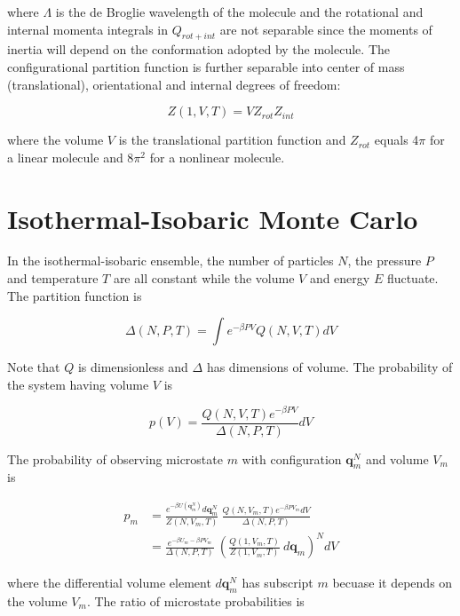 where $\Lambda$ is the de Broglie wavelength of the molecule and the rotational and internal momenta integrals in $Q_{rot+int}$ are not separable since the moments of inertia will depend on the conformation adopted by the molecule. The configurational partition function is further separable into center of mass (translational), orientational and internal degrees of freedom:

\begin{equation}
\label{eq:configPartitionFn_1VT}
Z(1,V,T) = VZ_{rot}Z_{int}
\end{equation}

where the volume $V$ is the translational partition function and $Z_{rot}$ equals 4$\pi$ for a linear molecule and 8$\pi^2$ for a nonlinear molecule.

\section{Isothermal-Isobaric Monte Carlo}
\label{sec:NPT}
In the isothermal-isobaric ensemble, the number of particles $N$, the pressure $P$ and temperature $T$ are all constant while the volume $V$ and energy $E$ fluctuate. The partition function is

\begin{equation}
\label{eq:partitionFn_NPT}
\Delta(N,P,T) = \int e^{-\beta P V} Q(N,V,T) dV
\end{equation}

Note that $Q$ is dimensionless and $\Delta$ has dimensions of volume. The probability of the system having volume $V$ is 

\begin{equation}
\label{eq:pV}
p(V) = \frac{Q(N,V,T)e^{-\beta P V}}{\Delta(N,P,T)}dV
\end{equation}

The probability of observing microstate $m$ with configuration $\mathbf{q}_m^N$ and volume $V_m$ is

\begin{align}
\label{eq:pNPT}
p_m &= \frac{e^{-\beta U(\mathbf{q}_m^N)}d\mathbf{q}_m^N}{Z(N,V_m,T)}\ \frac{Q(N,V_m,T) e^{-\beta P V_m} dV}{\Delta(N,P,T)} \nonumber \\
&= \frac{e^{-\beta U_m - \beta P V_m}}{\Delta(N,P,T)}\ \left(\frac{Q(1,V_m,T)}{Z(1,V_m,T)}\ d\mathbf{q}_m\right)^N dV
\end{align}

where the differential volume element $d\mathbf{q}_m^N$ has subscript $m$ becuase it depends on the volume $V_m$. The ratio of microstate probabilities is

